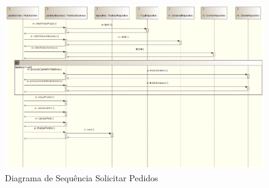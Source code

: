 \begin{landscape}
\begin{figure}[h!]
 \centering
 \includegraphics[scale=0.30]{capitulo07/digramaSequenciasSolicitarPedido.png}
 \caption{Diagrama de Sequência Solicitar Pedidos}
\end{figure}
\end{landscape}